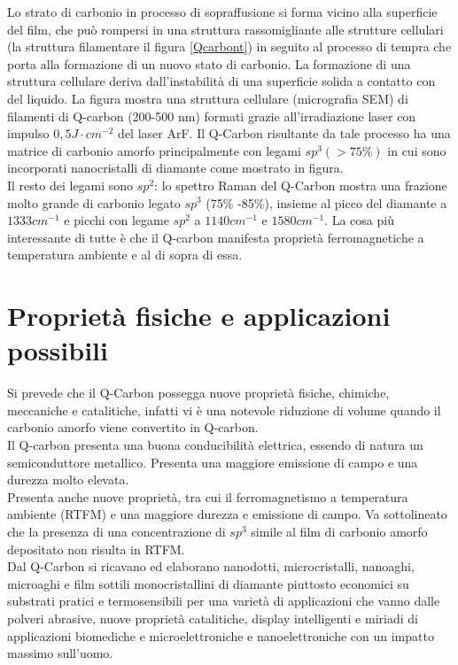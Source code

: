 \documentclass[a4paper,titlepage]{book}
\begin{document}
Lo strato di carbonio in processo di sopraffusione si forma vicino alla superficie del film, che può rompersi in una struttura rassomigliante alle strutture cellulari (la struttura filamentare il figura \ref{Qcarbont}) in seguito al processo di tempra che porta alla formazione di un nuovo stato di carbonio.
La formazione di una struttura cellulare deriva dall'instabilità di una superficie solida a contatto con del liquido. La figura mostra una struttura cellulare (micrografia SEM) di filamenti di Q-carbon (200-500 nm) formati grazie all'irradiazione laser con impulso $0,5 J \cdot cm^{-2}$ del laser ArF. Il Q-Carbon risultante da tale processo ha una matrice di carbonio amorfo principalmente con legami $sp^3 (> 75\%)$ in cui sono incorporati nanocristalli di diamante come mostrato in figura. \\
Il resto dei legami sono $sp^2$: lo spettro Raman del Q-Carbon mostra una frazione molto grande di carbonio legato $sp^3$ (75\% -85\%), insieme al picco del diamante a $1333 cm^{-1}$ e picchi con legame $sp^2$ a $1140 cm^{-1}$ e $1580 cm^{-1}$.
La cosa più interessante di tutte è che il Q-carbon manifesta proprietà ferromagnetiche a temperatura ambiente e al di sopra di essa.
\section{Proprietà fisiche e applicazioni possibili}
Si prevede che il  Q-Carbon possegga nuove proprietà fisiche, chimiche, meccaniche e catalitiche, infatti vi è una notevole riduzione di volume quando il carbonio amorfo viene convertito in Q-carbon.\\
Il Q-carbon presenta una buona conducibilità elettrica, essendo di natura un semiconduttore metallico. Presenta una maggiore emissione di campo e una durezza molto elevata. \\
Presenta anche nuove proprietà, tra cui il ferromagnetismo a temperatura ambiente (RTFM) e una maggiore durezza e emissione di campo. Va sottolineato che la presenza di una concentrazione di $sp^3$ simile al film di carbonio amorfo depositato non risulta in RTFM. \\
Dal Q-Carbon si ricavano ed elaborano nanodotti, microcristalli, nanoaghi, microaghi e film sottili monocristallini di diamante piuttosto economici su substrati pratici e termosensibili per una varietà di applicazioni che vanno dalle polveri abrasive, nuove proprietà catalitiche, display intelligenti e miriadi di applicazioni biomediche e microelettroniche e nanoelettroniche con un impatto massimo sull'uomo. 
\end{document}
